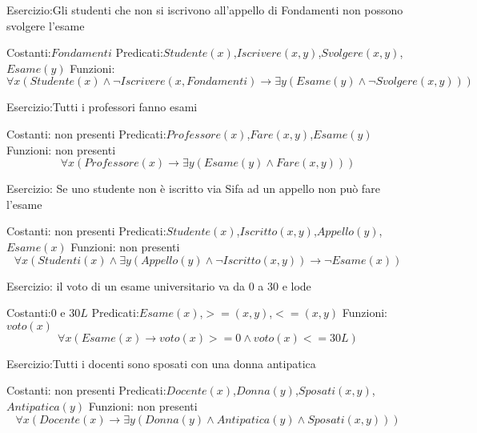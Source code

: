 Esercizio:Gli studenti che non si iscrivono all'appello di Fondamenti non possono svolgere l'esame

Costanti:$Fondamenti$
Predicati:$Studente(x)$,$Iscrivere(x,y)$,$Svolgere(x,y)$,$Esame(y)$
Funzioni:
\begin{equation*}
\forall x (Studente(x) \land \neg Iscrivere(x,Fondamenti) \rightarrow
\exists y (Esame(y) \land \neg Svolgere(x,y)))
\end{equation*}

Esercizio:Tutti i professori fanno esami

Costanti: non presenti \newline
Predicati:$Professore(x)$,$Fare(x,y)$,$Esame(y)$ \newline
Funzioni: non presenti
\begin{equation*}
    \forall x (Professore(x) \rightarrow \exists y(Esame(y) \land Fare(x,y)))
\end{equation*}

Esercizio: Se uno studente non è iscritto via Sifa ad un appello non può fare l'esame

Costanti: non presenti \newline
Predicati:$Studente(x)$,$Iscritto(x,y)$,$Appello(y)$,$Esame(x)$ \newline
Funzioni: non presenti
\begin{equation*}
    \forall x (Studenti(x) \land \exists y(Appello(y) \land \neg Iscritto(x,y)) \rightarrow \neg Esame(x))
\end{equation*}

Esercizio: il voto di un esame universitario va da 0 a 30 e lode

Costanti:$0$ e $30L$ \newline
Predicati:$Esame(x)$,$>=(x,y)$,$<=(x,y)$ \newline
Funzioni:$voto(x)$
\begin{equation*}
    \forall x (Esame(x) \rightarrow voto(x) >= 0 \land voto(x) <= 30L)
\end{equation*}

Esercizio:Tutti i docenti sono sposati con una donna antipatica

Costanti: non presenti \newline
Predicati:$Docente(x)$,$Donna(y)$,$Sposati(x,y)$,$Antipatica(y)$ \newline
Funzioni: non presenti
\begin{equation*}
    \forall x (Docente(x) \rightarrow \exists y(Donna(y) \land Antipatica(y) \land Sposati(x,y)))
\end{equation*}

